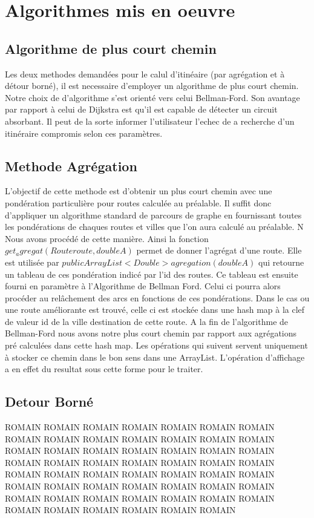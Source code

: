 \chapter{Algorithmes mis en oeuvre}


\section{Algorithme de plus court chemin}
Les deux methodes demandées pour le calul d'itinéaire (par agrégation et à détour borné), il est necessaire  d'employer un algorithme de plus court chemin. Notre choix de d'algorithme s'est orienté vers celui Bellman-Ford. Son avantage par rapport à celui de Dijkstra est qu'il est capable de détecter un circuit absorbant. Il peut de la sorte informer l'utilisateur l'echec de a recherche d'un itinéraire compromis selon ces paramètres. 



\section{Methode Agrégation}
L'objectif de cette methode est d'obtenir un plus court chemin avec une pondération particulière pour routes calculée au préalable.
Il suffit donc d'appliquer un algorithme standard de parcours de graphe en fournissant toutes les pondérations de chaques routes et villes que l'on aura calculé au préalable. N Nous avons procédé de cette manière. Ainsi la fonction $get_agregat(Route route, double A)$ permet de donner l'agrégat d'une route. Elle est utilisée par  $public ArrayList<Double> agregation(double A)$ qui retourne un tableau de ces pondération indicé par l'id des routes. Ce tableau est ensuite fourni en paramètre à l'Algorithme de Bellman Ford. Celui ci pourra alors procéder au relâchement des arcs en fonctions de ces pondérations. Dans le cas ou une route améliorante est trouvé, celle ci est stockée dans une hash map à la clef de valeur id de la ville destination de cette route. A la fin de l'algorithme de Bellman-Ford  nous avons notre plus court chemin par rapport aux agrégations pré calculées dans cette hash map. Les opérations qui suivent servent uniquement à stocker ce chemin dans le bon sens dans une ArrayList. L'opération d'affichage a en effet du resultat sous cette forme pour le traiter.

\clearpage
\section{Detour Borné}
  ROMAIN ROMAIN ROMAIN ROMAIN ROMAIN ROMAIN ROMAIN ROMAIN ROMAIN ROMAIN ROMAIN ROMAIN ROMAIN ROMAIN ROMAIN ROMAIN ROMAIN ROMAIN ROMAIN ROMAIN ROMAIN ROMAIN ROMAIN ROMAIN ROMAIN ROMAIN ROMAIN ROMAIN ROMAIN ROMAIN ROMAIN ROMAIN ROMAIN ROMAIN ROMAIN ROMAIN ROMAIN ROMAIN ROMAIN ROMAIN ROMAIN ROMAIN ROMAIN ROMAIN ROMAIN ROMAIN ROMAIN ROMAIN ROMAIN ROMAIN ROMAIN ROMAIN ROMAIN ROMAIN ROMAIN



\clearpage
